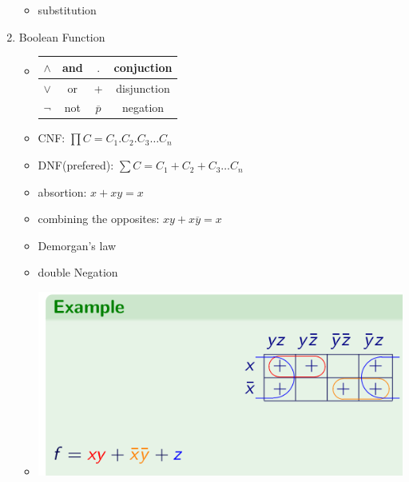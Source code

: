 \documentclass[11pt, a4paper]{article}
\begin{document}
\begin{enumerate}
\begin{itemize}
                \item substitution
            \end{itemize}
        \item Boolean Function
            \begin{itemize}
                \item             
                \begin{tabular}{|c|c|c|c|}
                    \hline
                    $\land$ & and & $.$ & conjuction\\
                    \hline
                    $\lor$ & or & + & disjunction\\
                    \hline
                    $\lnot$ & not & $\overline p$ & negation\\
                    \hline
                \end{tabular}
                \item CNF: $\prod C = C_1.C_2.C_3 \dots C_n$ 
                \item DNF(prefered): $\sum C = C_1+C_2+C_3 \dots C_n$ 
                \item absortion: $x + xy =x$
                \item combining the opposites: $xy + x\overline y = x$
                \item Demorgan's law
                \item double Negation
                \item
                    \includegraphics[scale = 0.5]{Kmap}
            \end{itemize}
    \end{enumerate}
\end{document}
